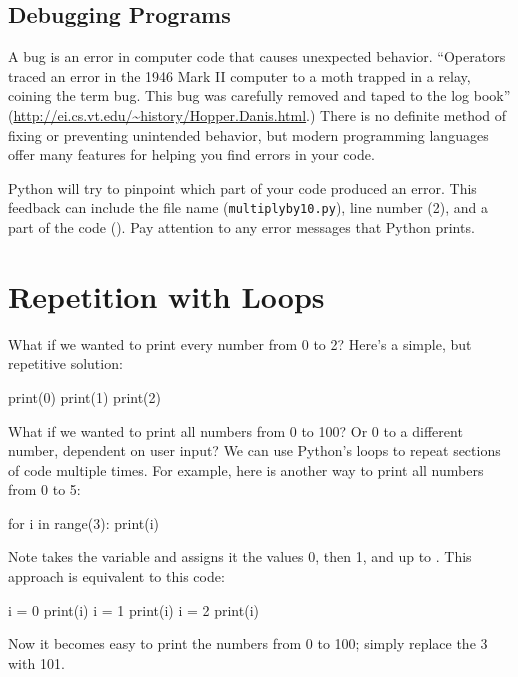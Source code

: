 \documentclass[11pt]{cselabheader}
\begin{document}
\subsection{Debugging Programs}
A bug is an error in computer code that causes unexpected behavior.
``Operators traced an error in the 1946 Mark II computer to a moth
trapped in a relay, coining the term bug. This bug was carefully
removed and taped to the log book'' (\url{http://ei.cs.vt.edu/~history/Hopper.Danis.html}.)
There is no definite method of fixing or preventing unintended behavior,
but modern programming languages offer many features for helping you
find errors in your code.

Python will try to pinpoint which part of your code produced an error.
This feedback can include the file name (\texttt{multiplyby10.py}), line number (2),
and a part of the code ().
Pay attention to any error messages that Python prints.

\section{\texorpdfstring%
  {Repetition with  Loops}
  {Repetition with For Loops}}
What if we wanted to print every number from 0 to 2?
Here's a simple, but repetitive solution:

\begin{python3code}
print(0)
print(1)
print(2)
\end{python3code}

What if we wanted to print all numbers from 0 to 100?
Or 0 to a different number, dependent on user input?
We can use Python's  loops to repeat sections of code multiple times.
For example, here is another way to print all numbers from 0 to 5:

\begin{python3code}
for i in range(3):
    print(i)
\end{python3code}

Note  takes the variable
 and assigns it the values 0, then 1, and up to
.  This approach is equivalent to this code:

\begin{python3code}
i = 0
print(i)
i = 1
print(i)
i = 2
print(i)
\end{python3code}

Now it becomes easy to print the numbers from 0 to 100; simply replace the 3 with 101.
\end{document}
